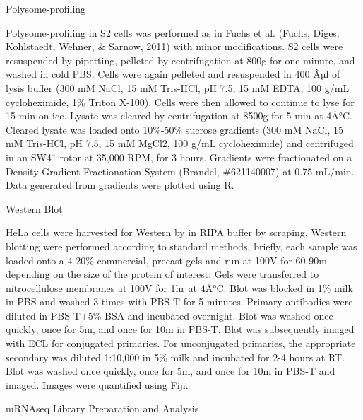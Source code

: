 \documentclass[12pt,twoside]{reedthesis}
\begin{document}
{Polysome-profiling}

Polysome-profiling in S2 cells was performed as in Fuchs et al.
(Fuchs, Diges, Kohlstaedt, Wehner, \& Sarnow, 2011) with minor modifications. S2
cells were resuspended by pipetting, pelleted by centrifugation at 800g
for one minute, and washed in cold PBS. Cells were again pelleted and
resuspended in 400 Âµl of lysis buffer (300 mM NaCl, 15 mM Tris-HCl, pH
7.5, 15 mM EDTA, 100 g/mL cycloheximide, 1\% Triton X-100). Cells were
then allowed to continue to lyse for 15 min on ice. Lysate was cleared
by centrifugation at 8500g for 5 min at 4Â°C. Cleared lysate was loaded
onto 10\%-50\% sucrose gradients (300 mM NaCl, 15 mM Tris-HCl, pH 7.5, 15
mM MgCl2, 100 g/mL cycloheximide) and centrifuged in an SW41 rotor at
35,000 RPM, for 3 hours. Gradients were fractionated on a Density
Gradient Fractionation System (Brandel, \#621140007) at 0.75 mL/min.
Data generated from gradients were plotted using R.

{Western Blot}

HeLa cells were harvested for Western by in RIPA buffer by scraping.
Western blotting were performed according to standard methods, briefly,
each sample was loaded onto a 4-20\% commercial, precast gels and run at
100V for 60-90m depending on the size of the protein of interest. Gels
were transferred to nitrocellulose membranes at 100V for 1hr at 4Â°C.
Blot was blocked in 1\% milk in PBS and washed 3 times with PBS-T for 5
minutes. Primary antibodies were diluted in PBS-T+5\% BSA and incubated
overnight. Blot was washed once quickly, once for 5m, and once for 10m
in PBS-T. Blot was subsequently imaged with ECL for conjugated
primaries. For unconjugated primaries, the appropriate secondary was
diluted 1:10,000 in 5\% milk and incubated for 2-4 hours at RT. Blot was
washed once quickly, once for 5m, and once for 10m in PBS-T and imaged.
Images were quantified using Fiji.

{mRNAseq Library Preparation and Analysis}
\end{document}
